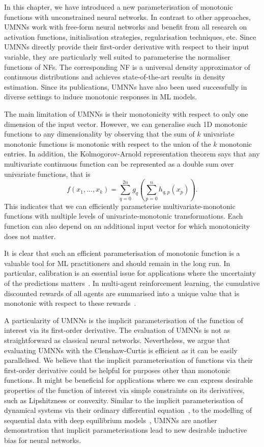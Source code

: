 In this chapter, we have introduced a new parameterisation of monotonic functions with unconstrained neural networks. In contrast to other approaches, UMNNs work with free-form neural networks and benefit from all research on activation functions, initialisation strategies, regularisation techniques, etc. Since UMNNs directly provide their first-order derivative with respect to their input variable, they are particularly well suited to parameterise the normaliser functions of NFs. The corresponding NF is a universal density approximator of continuous distributions and achieves state-of-the-art results in density estimation. Since its publications, UMNNs have also been used successfully in diverse settings to induce monotonic responses in ML models.

The main limitation of UMNNs is their monotonicity with respect to only one dimension of the input vector. However, we can generalise such 1D monotonic functions to any dimensionality by observing that the sum of $k$ univariate monotonic functions is monotonic with respect to the union of the $k$ monotonic entries. In addition, the Kolmogorov-Arnold representation theorem says that any multivariate continuous function can be represented as a double sum over univariate functions, that is
$$ f(x_1, \dots, x_k) = \sum_{q=0}^{2n}g_q\left( \sum_{p=0}^{n} h_{q,p}(x_p) \right). $$
This indicates that we can efficiently parameterise multivariate-monotonic functions with multiple levels of univariate-monotonic transformations. Each function can also depend on an additional input vector for which monotonicity does not matter.

It is clear that such an efficient parameterisation of monotonic function is a valuable tool for ML practitioners and should remain in the long run. In particular, calibration is an essential issue for applications where the uncertainty of the predictions matters~\citep{minderer2021revisiting, guo2017calibration, cranmer2015approximating}. In multi-agent reinforcement learning, the cumulative discounted rewards of all agents are summarised into a unique value that is monotonic with respect to these rewards~\citep{rashid2018qmix, leroy2020qvmix}.

A particularity of UMNNs is the implicit parameterisation of the function of interest via its first-order derivative. The evaluation of UMNNs is not as straightforward as classical neural networks. Nevertheless, we argue that evaluating UMNNs with the Clenshaw-Curtis is efficient as it can be easily parallelised. We believe that the implicit parameterisation of functions via their first-order derivative could be helpful for purposes other than monotonic functions. It might be beneficial for applications where we can express desirable properties of the function of interest via simple constraints on its derivatives, such as Lipshitzness or convexity. Similar to the implicit parameterisation of dynamical systems via their ordinary differential equation~\citep{chen_neural_2018}, to the modelling of sequential data with deep equilibrium models~\citep{bai2019deep}, UMNNs are another demonstration that implicit parameterisations lead to new desirable inductive bias for neural networks.
